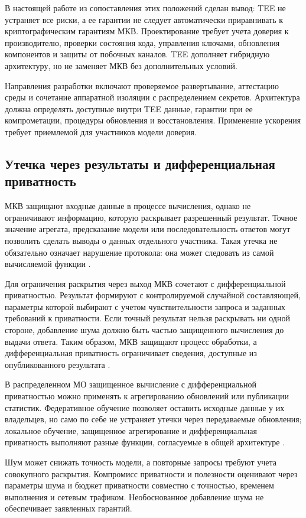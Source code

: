 В настоящей работе из сопоставления этих положений сделан вывод: TEE не устраняет все риски, а ее гарантии не следует автоматически приравнивать к криптографическим гарантиям МКВ. Проектирование требует учета доверия к производителю, проверки состояния кода, управления ключами, обновления компонентов и защиты от побочных каналов. TEE дополняет гибридную архитектуру, но не заменяет МКВ без дополнительных условий.

Направления разработки включают проверяемое развертывание, аттестацию среды и сочетание аппаратной изоляции с распределением секретов. Архитектура должна определять доступные внутри TEE данные, гарантии при ее компрометации, процедуры обновления и восстановления. Применение ускорения требует приемлемой для участников модели доверия.

\subsection{Утечка через результаты и дифференциальная приватность}
\label{subsec:dp}

МКВ защищают входные данные в процессе вычисления, однако не ограничивают информацию, которую раскрывает разрешенный результат. Точное значение агрегата, предсказание модели или последовательность ответов могут позволить сделать выводы о данных отдельного участника. Такая утечка не обязательно означает нарушение протокола: она может следовать из самой вычисляемой функции \cite{06}.

Для ограничения раскрытия через выход МКВ сочетают с дифференциальной приватностью. Результат формируют с контролируемой случайной составляющей, параметры которой выбирают с учетом чувствительности запроса и заданных требований к приватности. Если точный результат нельзя раскрывать ни одной стороне, добавление шума должно быть частью защищенного вычисления до выдачи ответа. Таким образом, МКВ защищают процесс обработки, а дифференциальная приватность ограничивает сведения, доступные из опубликованного результата \cite{06}\cite{13}.

В распределенном МО защищенное вычисление с дифференциальной приватностью можно применять к агрегированию обновлений или публикации статистик. Федеративное обучение позволяет оставить исходные данные у их владельцев, но само по себе не устраняет утечки через передаваемые обновления; локальное обучение, защищенное агрегирование и дифференциальная приватность выполняют разные функции, согласуемые в общей архитектуре \cite{13}.

Шум может снижать точность модели, а повторные запросы требуют учета совокупного раскрытия. Компромисс приватности и полезности оценивают через параметры шума и бюджет приватности совместно с точностью, временем выполнения и сетевым трафиком. Необоснованное добавление шума не обеспечивает заявленных гарантий.

